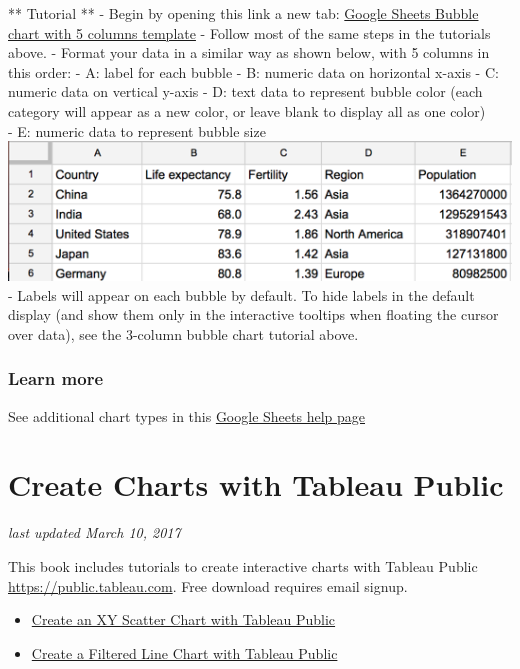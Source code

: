 \documentclass[
  english,
]{book}
\providecommand{\tightlist}{%
  \setlength{\itemsep}{0pt}\setlength{\parskip}{0pt}}
\begin{document}
** Tutorial **
- Begin by opening this link a new tab: \href{https://docs.google.com/spreadsheets/d/1YgBWYm9nTGlCuyqSwU3SDb7xk-SMSPgjfYq5iLqL0nQ/}{Google Sheets Bubble chart with 5 columns template}
- Follow most of the same steps in the tutorials above.
- Format your data in a similar way as shown below, with 5 columns in this order:
- A: label for each bubble
- B: numeric data on horizontal x-axis
- C: numeric data on vertical y-axis
- D: text data to represent bubble color (each category will appear as a new color, or leave blank to display all as one color)\\
- E: numeric data to represent bubble size
\includegraphics{images/05-chart/bubble-chart-5-column-data.png}
- Labels will appear on each bubble by default. To hide labels in the default display (and show them only in the interactive tooltips when floating the cursor over data), see the 3-column bubble chart tutorial above.

\hypertarget{learn-more-7}{%
\subsubsection*{Learn more}\label{learn-more-7}}

See additional chart types in this \href{https://support.google.com/docs/answer/190718}{Google Sheets help page}

\hypertarget{tableau-public}{%
\section{Create Charts with Tableau Public}\label{tableau-public}}

\emph{last updated March 10, 2017}

This book includes tutorials to create interactive charts with Tableau Public \url{https://public.tableau.com}. Free download requires email signup.

\begin{itemize}
\tightlist
\item
  \href{scatter-chart-tableau}{Create an XY Scatter Chart with Tableau Public}
\item
  \href{filtered-line-chart-tableau}{Create a Filtered Line Chart with Tableau Public}
\end{itemize}
\end{document}
